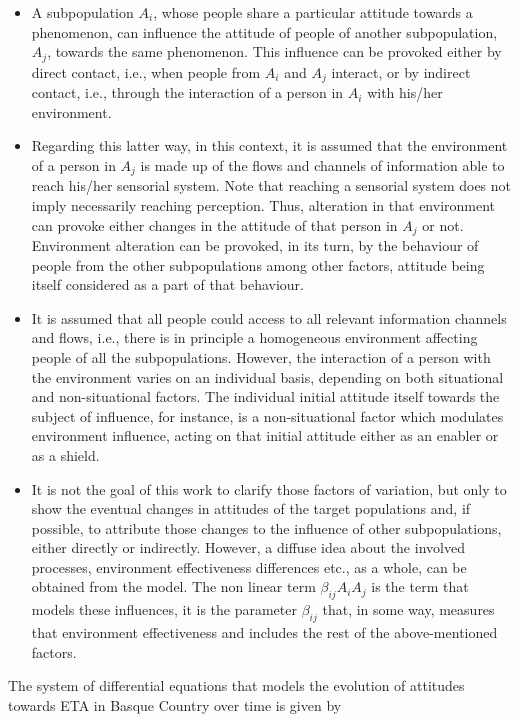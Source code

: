 \begin{itemize}
\item A subpopulation $A_i$, whose people share a particular attitude towards a phenomenon, can influence the attitude of people of another subpopulation, $A_j$, towards the same phenomenon. This influence can be provoked either by direct contact, i.e., when people from $A_i$ and $A_j$ interact, or by indirect contact, i.e., through the interaction of a person in $A_i$ with his/her environment.
\item Regarding this latter way, in this context, it is assumed that the environment of a person in $A_j$ is made up of the flows and channels of information able to reach his/her sensorial system. Note that reaching a sensorial system does not imply necessarily reaching perception. Thus, alteration in that environment can provoke either changes in the attitude of that person in $A_j$ or not. Environment alteration can be provoked, in its turn, by the behaviour of people from the other subpopulations among other factors, attitude being itself considered as a part of that behaviour.
\item It is assumed that all people could access to all relevant information channels and flows, i.e., there is in principle a homogeneous environment affecting people of all the subpopulations. However, the interaction of a person with the environment varies on an individual basis, depending on both situational and non-situational factors. The individual initial attitude itself towards the subject of influence, for instance, is a non-situational factor which modulates environment influence, acting on that initial attitude either as an enabler or as a shield. 
\item It is not the goal of this work to clarify those factors of variation, but only to show the eventual changes in attitudes of the target populations and, if possible, to attribute those changes to the influence of other subpopulations, either directly or indirectly.  However, a diffuse idea about the involved processes, environment effectiveness differences etc., as a whole, can be obtained from the model. The non linear term $\beta_{ij} A_i A_j$ is the term that models these influences, it is the parameter $\beta_{ij}$ that, in some way, measures that environment effectiveness and includes the rest of the above-mentioned factors.
\end{itemize} 

The system of differential equations that models the evolution of attitudes towards ETA in Basque Country over time is given by

